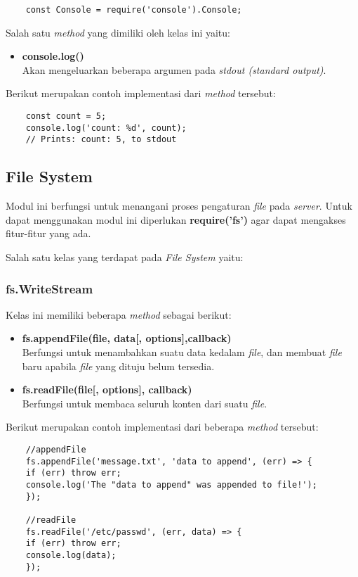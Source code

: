 \begin{lstlisting}
	const Console = require('console').Console;
\end{lstlisting}

Salah satu \textit{method} yang dimiliki oleh kelas ini yaitu: 

\begin{itemize}
	\item \textbf{console.log()} \\ Akan mengeluarkan beberapa argumen pada \textit{stdout (standard output)}.
\end{itemize}

Berikut merupakan contoh implementasi dari \textit{method} tersebut:

\begin{lstlisting}
	const count = 5;
	console.log('count: %d', count);
	// Prints: count: 5, to stdout
\end{lstlisting}

\subsection{File System}
Modul ini berfungsi untuk menangani proses pengaturan \textit{file} pada \textit{server}. Untuk dapat menggunakan modul ini diperlukan \textbf{require('fs')} agar dapat mengakses fitur-fitur yang ada.

Salah satu kelas yang terdapat pada \textit{File System} yaitu: 

\subsubsection{fs.WriteStream}
Kelas ini memiliki beberapa \textit{method} sebagai berikut: 

\begin{itemize}
	\item \textbf{fs.appendFile(file, data[, options],callback)} \\ Berfungsi untuk menambahkan suatu data kedalam \textit{file}, dan membuat \textit{file} baru apabila \textit{file} yang dituju belum tersedia.
	\item \textbf{fs.readFile(file[, options], callback)} \\ Berfungsi untuk membaca seluruh konten dari suatu \textit{file}.
\end{itemize}

Berikut merupakan contoh implementasi dari beberapa \textit{method} tersebut:

\begin{lstlisting}
	//appendFile
	fs.appendFile('message.txt', 'data to append', (err) => {
	if (err) throw err;
	console.log('The "data to append" was appended to file!');
	});
	
	//readFile
	fs.readFile('/etc/passwd', (err, data) => {
	if (err) throw err;
	console.log(data);
	});
\end{lstlisting}

